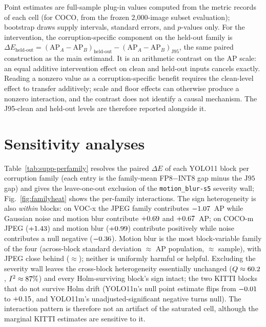 \documentclass[10pt]{article}
\newcommand{\AP}{\mathrm{AP}}
\newcommand{\Jclean}{\mathrm{J95}}
\begin{document}
Point estimates are full-sample plug-in values computed from the metric
records of each cell (for COCO, from the frozen 2,000-image subset
evaluation); bootstrap draws supply intervals, standard errors, and
$p$-values only. For the intervention, the corruption-specific component on
the held-out family is
$\Delta E_{\text{held-out}}=(\AP_A-\AP_B)_{\text{held-out}}-(\AP_A-\AP_B)_{\Jclean}$,
the same paired construction as the main estimand. It is an arithmetic
contrast on the AP scale: an equal additive intervention effect on clean and
held-out inputs cancels exactly. Reading a nonzero value as a corruption-specific
benefit requires the clean-level effect to transfer additively; scale and floor
effects can otherwise produce a nonzero interaction, and the contrast does not
identify a causal mechanism. The J95-clean and held-out levels are therefore
reported alongside it.

\section{Sensitivity analyses}

Table~\ref{tab:supp-perfamily} resolves the paired $\Delta E$ of each
YOLO11 block per corruption family (each entry is the family-mean FP8$-$INT8
gap minus the $\Jclean$ gap) and gives the leave-one-out exclusion of the
\texttt{motion\_blur-s5} severity wall; Fig.~\ref{fig:familyheat} shows the
per-family interactions. The sign heterogeneity is also
\emph{within} blocks: on VOC-x the JPEG family contributes $-1.07$~AP while
Gaussian noise and motion blur contribute $+0.69$ and $+0.67$~AP;
on COCO-m JPEG ($+1.43$) and
motion blur ($+0.99$) contribute positively while noise contributes a
null negative ($-0.36$).
Motion blur is the most block-variable family of the four (across-block
standard deviation $\approx$\nnFamSDpMb{} AP population, $\approx$\nnFamSDsMb{} sample), with
JPEG close behind ($\approx$\nnFamSDpJpeg); neither is uniformly
harmful or helpful. Excluding the severity wall leaves the
cross-block heterogeneity essentially unchanged ($Q\approx60.2$,
$I^2\approx87\%$) and every Holm-surviving block's sign intact; the two
KITTI blocks that do not survive Holm drift (YOLO11n's null point estimate flips from
$-0.01$ to $+0.15$, and YOLO11m's unadjusted-significant negative turns
null). The interaction
pattern is therefore not an artifact of the saturated cell, although the
marginal KITTI estimates are sensitive to it.
\end{document}
